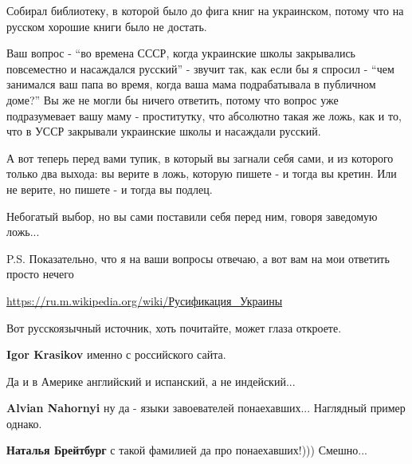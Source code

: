 \begin{itemize}
\begin{itemize}
Собирал библиотеку, в которой было до фига книг на украинском, потому что на
русском хорошие книги было не достать.

Ваш вопрос - \enquote{во времена СССР, когда украинские школы закрывались повсеместно и
насаждался русский} - звучит так, как если бы я спросил - \enquote{чем занимался ваш
папа во время, когда ваша мама подрабатывала в публичном доме?} Вы же не могли
бы ничего ответить, потому что вопрос уже подразумевает вашу маму -
проститутку, что абсолютно такая же ложь, как и то, что в УССР закрывали
украинские школы и насаждали русский.

А вот теперь перед вами тупик, в который вы загнали себя сами, и из которого
только два выхода: вы верите в ложь, которую пишете - и тогда вы кретин. Или не
верите, но пишете - и тогда вы подлец.

Небогатый выбор, но вы сами поставили себя перед ним, говоря заведомую ложь...

P.S. Показательно, что я на ваши вопросы отвечаю, а вот вам на мои ответить
просто нечего \Smiley[1.0][yellow]

\url{https://ru.m.wikipedia.org/wiki/Русификация_Украины}

Вот русскоязычный источник, хоть почитайте, может глаза откроете.

\textbf{Igor Krasikov} именно с российского сайта.

\end{itemize}


Да и в Америке английский и испанский, а не индейский...


\begin{itemize}
\textbf{Alvian Nahornyi} ну да - языки завоевателей понаехавших... Наглядный пример однако.

\textbf{Наталья Брейтбург} с такой фамилией да про понаехавших!))) Смешно...


\end{itemize}
\end{itemize}
